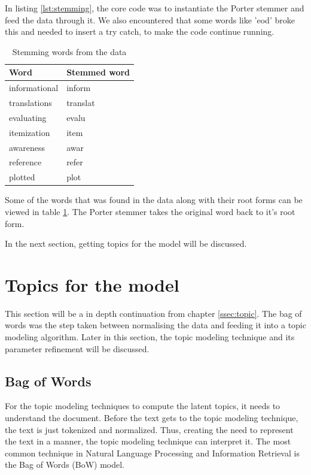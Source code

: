 In listing \ref{lst:stemming}, the core code was to instantiate the Porter stemmer and feed the data through it. We also encountered that some words like 'eod' broke this and needed to insert a try catch, to make the code continue running. 

\begin{table}[htbp]
\centering
\begin{tabular}{|l|l|}
\hline
\textbf{Word} & \textbf{Stemmed word} \\ \hline
informational & inform \\ \hline
translations & translat \\ \hline
evaluating & evalu \\ \hline
itemization & item \\ \hline
awareness & awar \\ \hline
reference & refer \\ \hline
plotted & plot \\ \hline
\end{tabular}
\caption{Stemming words from the data}
\label{tab:stemming}
\end{table}

Some of the words that was found in the data along with their root forms can be viewed in table \ref{tab:stemming}. The Porter stemmer takes the original word back to it's root form.

In the next section, getting topics for the model will be discussed.

\section{Topics for the model}
This section will be a in depth continuation from chapter \ref{ssec:topic}. The bag of words was the step  taken between normalising the data and feeding it into a topic modeling algorithm. Later in this section, the topic modeling technique and its parameter refinement will be discussed.

\subsection{Bag of Words}
For the topic modeling techniques to compute the latent topics, it needs to understand the document. Before the text gets to the topic modeling technique, the text is just tokenized and normalized. Thus, creating the need to represent the text in a manner, the topic modeling technique can interpret it. The most common technique in Natural Language Processing and Information Retrieval is the Bag of Words (BoW) model.

